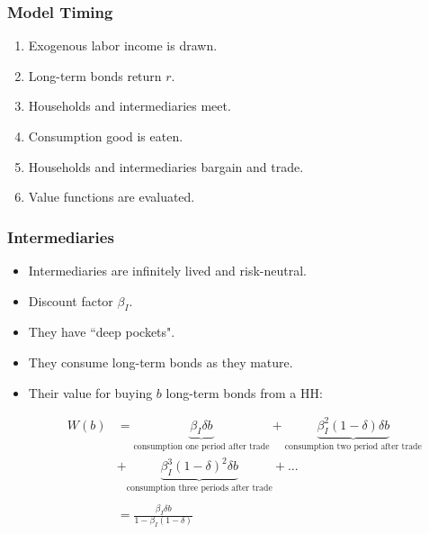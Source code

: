 \documentclass{beamer}
\begin{document}
\begin{frame}
\frametitle{Model Timing}

\begin{enumerate}[<+->]

\item Exogenous labor income is drawn.
\item Long-term bonds return $r$.
\item Households and intermediaries meet.
\item Consumption good is eaten.
\item Households and intermediaries bargain and trade.
\item Value functions are evaluated.

\end{enumerate}

\end{frame}





\begin{frame}
\frametitle{Intermediaries}

\begin{itemize}[<+->]

\item Intermediaries are infinitely lived and risk-neutral.
\item Discount factor $\beta_I$.
\item They have ``deep pockets".
\item They consume long-term bonds as they mature.
\item Their value for buying $b$ long-term bonds from a HH:

\begin{align*}
W(b) 
&= \underbrace{\beta_I\delta b}_{\text{consumption one period after trade}} + \underbrace{\beta_I^2(1-\delta)\delta b}_{\text{consumption two period after trade}} \\
&+ \underbrace{\beta_I^3(1-\delta)^2\delta b}_{\text{consumption three periods after trade}} + ...\\\\
&= \frac{\beta_I\delta b }{1 - \beta_I (1-\delta)}
\end{align*}

\end{itemize}

\end{frame}
\end{document}
